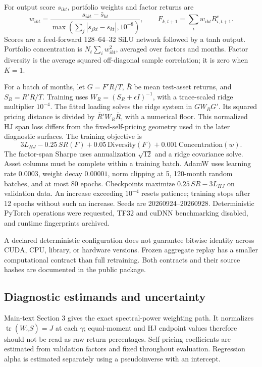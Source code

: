 \documentclass[11pt]{article}
\begin{document}
For output score $s_{ikt}$, portfolio weights and factor returns are
\begin{equation}
w_{ikt}=\frac{s_{ikt}-\bar s_{kt}}{\max(\sum_j|s_{jkt}-\bar s_{kt}|,10^{-8})},\qquad
F_{k,t+1}=\sum_iw_{ikt}R^e_{i,t+1}.
\end{equation}
Scores are a feed-forward 128--64--32 SiLU network followed by a tanh output. Portfolio concentration is $N_t\sum_iw_{ikt}^2$, averaged over factors and months. Factor diversity is the average squared off-diagonal sample correlation; it is zero when $K=1$.

For a batch of months, let $G=F'R/T$, $\bar R$ be mean test-asset returns, and $S_R=R'R/T$. Training uses $W_R=(S_R+\epsilon I)^{-1}$, with a trace-scaled ridge multiplier $10^{-4}$. The fitted loading solves the ridge system in $GW_RG'$. Its squared pricing distance is divided by $\bar R'W_R\bar R$, with a numerical floor. This normalized HJ span loss differs from the fixed-self-pricing geometry used in the later diagnostic surfaces. The training objective is
\begin{equation}
3 L_{HJ}-0.25\,SR(F)+0.05\,\mathrm{Diversity}(F)+0.001\,\mathrm{Concentration}(w).
\end{equation}
The factor-span Sharpe uses annualization $\sqrt{12}$ and a ridge covariance solve. Asset columns must be complete within a training batch. AdamW uses learning rate $0.0003$, weight decay $0.00001$, norm clipping at 5, 120-month random batches, and at most 80 epochs. Checkpoints maximize $0.25\,SR-3L_{HJ}$ on validation data. An increase exceeding $10^{-4}$ resets patience; training stops after 12 epochs without such an increase. Seeds are 20260924--20260928. Deterministic PyTorch operations were requested, TF32 and cuDNN benchmarking disabled, and runtime fingerprints archived.

A declared deterministic configuration does not guarantee bitwise identity across CUDA, CPU, library, or hardware versions. Frozen aggregate replay has a smaller computational contract than full retraining. Both contracts and their source hashes are documented in the public package.

\subsection{Diagnostic estimands and uncertainty}
Main-text Section 3 gives the exact spectral-power weighting path. It normalizes $\operatorname{tr}(W_\gamma S)=J$ at each $\gamma$; equal-moment and HJ endpoint values therefore should not be read as raw return percentages. Self-pricing coefficients are estimated from validation factors and fixed throughout evaluation. Regression alpha is estimated separately using a pseudoinverse with an intercept.
\end{document}
